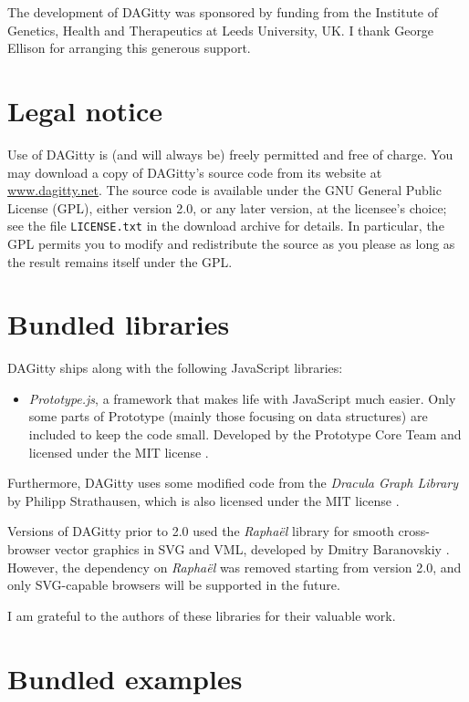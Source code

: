 \documentclass[a4paper]{article} %
\newcommand{\pp}{{\sc DAG}itty\xspace}
\begin{document}
The development of DAGitty was sponsored by funding from the 
Institute of Genetics, Health and Therapeutics at Leeds
University, UK. I thank George Ellison for arranging this
generous support.

\section{Legal notice}

Use of \pp is (and will always be) freely permitted and free of charge. 
You may download a copy of \pp's source code from its website at \url{www.dagitty.net}.
The source code is available under the GNU General Public License (GPL),
either version 2.0, or any later version, at the licensee's choice;
see the file \verb|LICENSE.txt| in the download archive for details.
In particular, the GPL permits you to  modify and redistribute the source
as you please as long as the result remains itself under the GPL.

\section{Bundled libraries}

\pp ships along with the following JavaScript libraries:

\begin{itemize} 
 \item \emph{Prototype.js}, a framework that makes life with JavaScript much easier. Only some 
  parts of Prototype (mainly those focusing on data structures) are included to keep the code small. Developed
  by the Prototype Core Team and licensed under the MIT license \cite{Prototype2010}. 
\end{itemize}

Furthermore, \pp uses some modified code from the \emph{Dracula Graph Library} by 
Philipp Strathausen, which is also licensed under the MIT license \cite{Dracula2010}. 

Versions of \pp prior to 2.0 used the \emph{Rapha\"el} library for smooth 
cross-browser vector graphics in SVG and VML, developed by Dmitry Baranovskiy 
\cite{Raphael2010}. However, the dependency on \emph{Rapha\"el} was removed starting
from version 2.0, and only SVG-capable browsers will be supported in the future.

I am grateful to the authors of these libraries for their valuable work. 

\section{Bundled examples}
\end{document}
